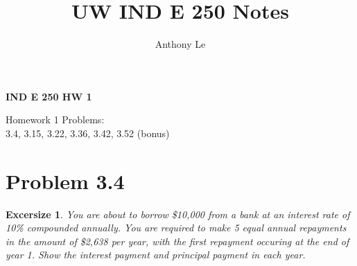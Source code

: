 \documentclass{report} %
\title{UW IND E 250 Notes}
\author{Anthony Le}
\newtheorem{exrc}{Excersize}
\begin{document}
\pagestyle{fancy}
\fancyhead{}

\begin{center}
    \LARGE{\textbf{IND E 250 HW 1}}
\end{center}
\begin{center}
    Homework 1 Problems: \\
    3.4, 3.15, 3.22, 3.36, 3.42, 3.52 (bonus)
\end{center}
\section*{Problem 3.4}
\begin{exrc}
    You are about to borrow \$10,000 from a bank at an interest rate of 10\% compounded annually. You are required to make 5 equal annual repayments in the amount of \$2,638 per year, with the first repayment occuring at the end of year 1. Show the interest payment and principal payment in each year.
\end{exrc}
\end{document}
